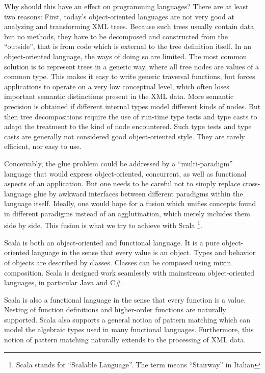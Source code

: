 Why should this have an effect on programming languages? There are at
least two reasons: First, today's object-oriented languages are not
very good at analyzing and transforming XML trees. Because such trees
usually contain data but no methods, they have to be decomposed and
constructed from the ``outside'', that is from code which is external
to the tree definition itself. In an object-oriented language, the
ways of doing so are limited. The most common solution \cite{w3c:dom} is
to represent trees in a generic way, where all tree nodes are values
of a common type.  This makes it easy to write generic traversal
functions, but forces applications to operate on a very low conceptual
level, which often loses important semantic distinctions present in
the XML data.  More semantic precision is obtained if different
internal types model different kinds of nodes.  But then tree
decompositions require the use of run-time type tests and type casts
to adapt the treatment to the kind of node encountered. Such type
tests and type casts are generally not considered good object-oriented
style. They are rarely efficient, nor easy to use.


Conceivably, the glue problem could be addressed by a ``multi-paradigm''
language that would express object-oriented, concurrent, as well
as functional aspects of an application.  But one needs to be careful
not to simply replace cross-language glue by awkward interfaces
between different paradigms within the language itself.  Ideally, one
would hope for a fusion which unifies concepts found in different
paradigms instead of an agglutination, which merely includes them side
by side.  This fusion is what we try to achieve with Scala
\footnote{Scala stands for ``Scalable Language''. The term means
  ``Stairway'' in Italian}.

Scala is both an object-oriented and functional language.  It is a
pure object-oriented language in the sense that every value is an
object. Types and behavior of objects are described by
classes. Classes can be composed using mixin composition.  Scala is
designed work seamlessly with mainstream object-oriented languages,
in particular Java and C\#.

Scala is also a functional language in the sense that every function
is a value. Nesting of function definitions and higher-order functions
are naturally supported. Scala also supports a general notion of
pattern matching which can model the algebraic types used in many
functional languages. Furthermore, this notion of pattern matching
naturally extends to the processing of XML data.

